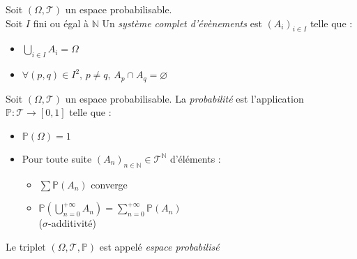 \documentclass[11pt,a4paper,fleqn,pdftex]{report}
\begin{document}
\begin{dfn}
     Soit $(\Omega, \mathscr{T})$ un espace probabilisable.\\
     Soit $I$ fini ou égal à $\mathbb{N}$\newline
     Un \emph{système complet d'évènements} est  $(A_i)_{i\in I}$ telle que :
     \begin{itemize}
         \item $\bigcup_{i\in I} A_i = \Omega$
         \item $\forall (p,q) \in I^2,\, p\neq q,\, A_p \cap A_q = \varnothing$
     \end{itemize}
\end{dfn}
\begin{dfn}[Probabilité]
     Soit $(\Omega, \mathscr{T})$ un espace probabilisable. La \emph{probabilité} est l'application $\mathbb{P} : \mathscr{T} \to [0,1]$ telle que :
     \begin{itemize}
         \item $\mathbb{P}(\Omega) = 1$
         \item Pour toute suite $(A_n)_{n\in\mathbb{N}} \in \mathscr{T}^\mathbb{N}$ d'éléments  : 
         \begin{itemize}
             \item $\sum \mathbb{P}(A_n)$ converge
             \item $\mathbb{P}\left( \bigcup_{n=0}^{+\infty} A_n \right) = \sum_{n=0}^{+\infty} \mathbb{P}(A_n)$\\
             ($\sigma$-additivité)
         \end{itemize}
     \end{itemize}
     Le triplet $(\Omega, \mathscr{T},\mathbb{P})$ est appelé \emph{espace probabilisé}
\end{dfn}
\end{document}
